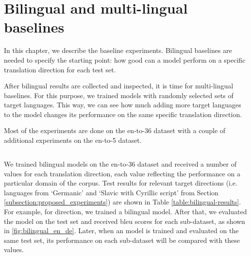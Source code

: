 \chapter{Bilingual and multi-lingual baselines}

In this chapter, we describe the baseline experiments.
Bilingual baselines are needed to specify the starting point:
how good can a model perform on a specific translation direction
for each test set.

After bilingual results are collected and inspected, it is time for
multi-lingual baselines. For this purpose, we trained models
with randomly selected sets of target languages.
This way, we can see how much adding more target languages to the model
changes its performance on the same specific translation direction.

Most of the experiments are done on the \gls{en-to-36} dataset with
a couple of additional experiments on the \gls{en-to-5} dataset.


\section{}
\label{section:bilingual_baseline}

We trained bilingual models on the \gls{en-to-36} dataset and received
a number of values for each translation direction, each value reflecting
the performance on a particular domain of the corpus.
Test results for relevant target directions (i.e. languages from
`Germanic' and `Slavic with Cyrillic script'
from Section \ref{subsection:proposed_experiments})
are shown in Table \ref{table:bilingual-results}.
For example, for  direction, we trained a bilingual model.
After that, we evaluated the model on the test set and received
\acrshort{bleu} scores for each sub-dataset, as shown
in \cref{fig:bilingual_en_de}.
Later, when an  model is trained and evaluated
on the same test set, its  performance on each sub-dataset
will be compared with these values.

